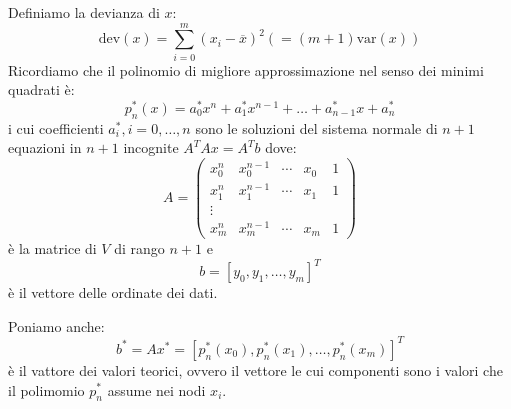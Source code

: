 \documentclass[12pt]{report}
\begin{document}
Definiamo la devianza di $x$:
\[
\text{dev}(x) = \displaystyle\sum_{i=0}^{m}(x_i - \overline{x})^2 (=(m+1)\text{var}(x))
\]
Ricordiamo che il polinomio di migliore approssimazione nel senso dei minimi quadrati è:
\[
p_n^*(x) = a_0^*x^n + a_1^*x^{n-1} + \dots + a^*_{n-1}x + a_n^*
\]
i cui coefficienti $a_i^*, i = 0, \dots, n$ sono le soluzioni del sistema normale di $n+1$ equazioni in $n+1$ incognite $A^TAx = A^Tb$ dove:
\[
A = \begin{pmatrix}
	x_0^n & x_0^{n-1} & \cdots & x_0 & 1 \\
	x_1 ^n & x_1^{n-1} & \cdots & x_1 & 1 \\
	\vdots \\
	x_m^n & x_m^{n-1} & \cdots & x_m & 1
\end{pmatrix}
\]
è la matrice di $V$ di rango $n+1$ e
\[
b = [y_0, y_1, \dots, y_m]^T
\]
è il vettore delle ordinate dei dati.

Poniamo anche:
\[
b^* = Ax^* = [p_n^*(x_0), p_n^*(x_1), \dots, p^*_n(x_m)]^T
\]
è il vattore dei valori teorici, ovvero il vettore le cui componenti sono i valori che il polimomio $p_n^*$ assume nei nodi $x_i$.
\end{document}
